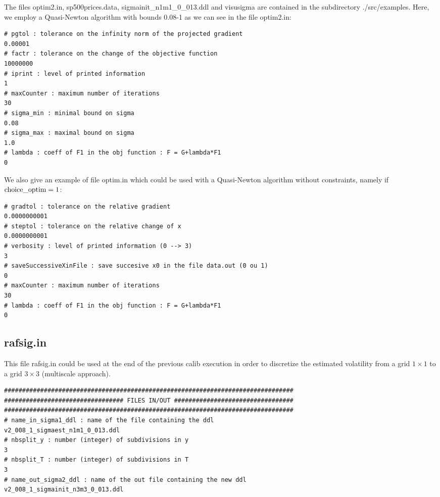 \documentclass[12pt]{article}
\begin{document}
The files optim2.in, sp500prices.data, sigmainit\_n1m1\_0\_013.ddl and 
visusigma are contained in the subdirectory ./src/examples. Here, we 
employ a Quasi-Newton algorithm with bounds 0.08-1 as we can see 
in the file optim2.in:

\begin{verbatim}
# pgtol : tolerance on the infinity norm of the projected gradient
0.00001
# factr : tolerance on the change of the objective function
10000000
# iprint : level of printed information
1
# maxCounter : maximum number of iterations
30
# sigma_min : minimal bound on sigma
0.08
# sigma_max : maximal bound on sigma
1.0
# lambda : coeff of F1 in the obj function : F = G+lambda*F1
0
\end{verbatim}

We also give an example of file optim.in which could be used 
with a Quasi-Newton algorithm without constraints, namely 
if ${\rm choice\_optim} = 1$:

\begin{verbatim}
# gradtol : tolerance on the relative gradient
0.0000000001
# steptol : tolerance on the relative change of x
0.0000000001
# verbosity : level of printed information (0 --> 3)
3
# saveSuccessiveXinFile : save succesive x0 in the file data.out (0 ou 1)
0
# maxCounter : maximum number of iterations
30
# lambda : coeff of F1 in the obj function : F = G+lambda*F1
0
\end{verbatim}

\subsection{rafsig.in}

This file rafsig.in could be used at the end of the previous calib 
execution in order to discretize the estimated volatility from 
a grid $1 \times 1$ to a grid $3 \times 3$ (multiscale 
approach).

\begin{verbatim}
################################################################################
################################# FILES IN/OUT #################################
################################################################################
# name_in_sigma1_ddl : name of the file containing the ddl
v2_008_1_sigmaest_n1m1_0_013.ddl
# nbsplit_y : number (integer) of subdivisions in y
3
# nbsplit_T : number (integer) of subdivisions in T
3
# name_out_sigma2_ddl : name of the out file containing the new ddl
v2_008_1_sigmainit_n3m3_0_013.ddl
\end{verbatim}
\end{document}
